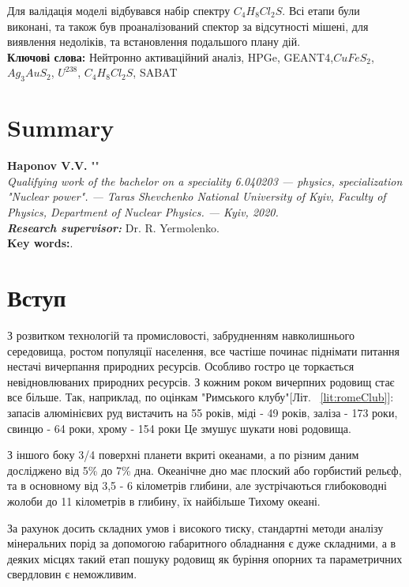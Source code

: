 \documentclass[a4paper, 14pt]{article}
\numberwithin{equation}{section}
\numberwithin{table}{section}
\begin{document}
	Для валідація моделі відбувався набір спектру $C_4H_8Cl_2S$.
	Всі етапи були виконані, та також був проаналізований спектор за відсутності мішені, для виявлення недоліків, та встановлення подальшого плану дій. \\
	{\bf Ключові слова:} Нейтронно активаційний аналіз, HPGe, GEANT4,$CuFeS_2$, $Ag_3AuS_2$, $U^{238}$, $C_4H_8Cl_2S$, SABAT
	
	\newpage
	\thispagestyle{empty}
	\section*{Summary}
	
	{\bf Haponov V.V.} ""\\
	{\itshape Qualifying work of the bachelor on a speciality 6.040203 --- physics, specialization "Nuclear power". --- Taras Shevchenko National University of Kyiv, Faculty of Physics, Department of Nuclear Physics. --- Kyiv, 2020.\\}
	{\itshape \bfseries Research supervisor:} Dr. R. Yermolenko.
	\\[0.5cm]
	{\bf Key words:}.
	
	\newpage
	\tableofcontents
	\newpage
	\pagestyle{plain}
	\setcounter{page}{2}
	
	\newpage
	\section{Вступ}
	
	З розвитком технологій та промисловості, забрудненням навколишнього середовища, ростом популяції населення, все частіше починає піднімати питання нестачі вичерпання природних ресурсів. Особливо гостро це торкається невідновлюваних природних ресурсів. З кожним роком вичерпних родовищ стає все більше. Так, наприклад, по оцінкам "Римського клубу"[Літ. ~\ref{lit:romeClub}]: запасів алюмінієвих руд вистачить на 55 років, міді - 49 років, заліза - 173 роки, свинцю - 64 роки, хрому - 154 роки Це змушує шукати нові родовища.
	
	З іншого боку 3/4 поверхні планети вкриті океанами, а по різним даним досліджено від 5\% до 7\% дна.
	Океанічне дно має плоский або горбистий рельєф, та в основному від 3,5 - 6 кілометрів глибини, але зустрічаються глибоководні жолоби до 11 кілометрів в глибину, їх найбільше Тихому океані. 
	
	За рахунок досить складних умов і високого тиску, стандартні методи аналізу мінеральних порід за допомогою габаритного обладнання є дуже складними, а в деяких місцях такий етап пошуку родовищ як буріння опорних та параметричних свердловин є неможливим.
	
\end{document}
